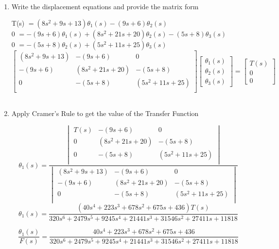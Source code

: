 \begin{fold}
\begin{enumerate}[label=(\alph*),itemindent=*, itemindent=*, leftmargin=*, nolistsep]
		\item Write the displacement equations and provide the matrix form
\begin{center}
	T(s) $= (8s^2 + 9s + 13)\theta_1(s) - (9s + 6)\theta_2(s)$\\
	0 $= -(9s + 6)\theta_1(s) + (8s^2 + 21s + 20)\theta_2(s) -(5s+8)\theta_3(s)$\\
	0 $= -(5s + 8)\theta_2(s) + (5s^2 + 11s + 25)\theta_3(s)$\\
	\[
		\begin{bmatrix}
		(8s^2 + 9s + 13) & -(9s + 6) & 0\\
		-(9s + 6) & (8s^2 + 21s + 20) & -(5s+8)\\
		0 & -(5s+8) & (5s^2 + 11s + 25)\\
		\end{bmatrix}
		\begin{bmatrix}
		\theta_1(s) \\
		\theta_2(s) \\
		\theta_3(s)
		\end{bmatrix}
		=
		\begin{bmatrix}
		T(s)\\
		0\\
		0
		\end{bmatrix}
	\]\\
\end{center}
		\item Apply Cramer's Rule to get the value of the Transfer Function
\begin{center}
	\[
		\theta_1(s) = 
			\frac{\begin{vmatrix}
				T(s) & -(9s + 6) & 0\\
		          0 & (8s^2 + 21s + 20) & -(5s+8)\\
		          0 & -(5s+8) & (5s^2 + 11s + 25)\\
			\end{vmatrix}
		}{\begin{vmatrix}
				(8s^2 + 9s + 13) & -(9s + 6) & 0\\
		          -(9s + 6) & (8s^2 + 21s + 20) & -(5s+8)\\
		          0 & -(5s+8) & (5s^2 + 11s + 25)\\
			\end{vmatrix}
		}
	\]
	\[
	\theta_1(s) = \frac{(40s^4 + 223s^3 + 678s^2 + 675s + 436)T(s)}{320s^6 + 2479s^5 + 9245s^4 + 21441s^3 + 31546s^2 + 27411s + 11818}
	\] 

	\[
	\boxed{\frac{\theta_1(s)}{F(s)} = \frac{40s^4 + 223s^3 + 678s^2 + 675s + 436}{320s^6 + 2479s^5 + 9245s^4 + 21441s^3 + 31546s^2 + 27411s + 11818}}
	\] 

\end{center}
	\end{enumerate}


\end{fold}

